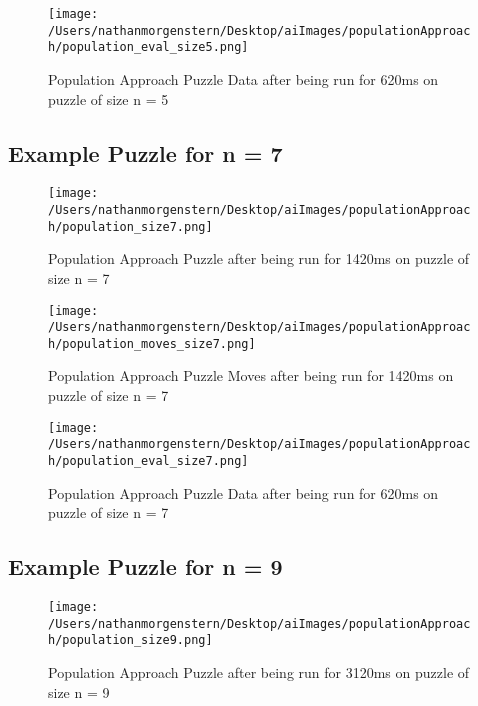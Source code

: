 \documentclass{report}
\begin{document}
	\begin{figure}[H]
	\centering
	\texttt{[image: /Users/nathanmorgenstern/Desktop/aiImages/populationApproach/population\_eval\_size5.png]}
	\caption{Population Approach Puzzle Data after being run for 620ms on puzzle of size n = 5}
	\label{fig: Population Approach Puzzle Data after being run for 620ms on puzzle of size n = 5}
	\end{figure}

\subsection{Example Puzzle for n = 7}

	\begin{figure}[H]
	\centering
	\texttt{[image: /Users/nathanmorgenstern/Desktop/aiImages/populationApproach/population\_size7.png]}
	\caption{Population Approach Puzzle after being run for 1420ms on puzzle of size n = 7}
	\label{fig: Population Approach Puzzle after being run for 1420ms on puzzle of size n = 7}
	\end{figure}
	
	\begin{figure}[H]
	\centering
	\texttt{[image: /Users/nathanmorgenstern/Desktop/aiImages/populationApproach/population\_moves\_size7.png]}
	\caption{Population Approach Puzzle Moves after being run for 1420ms on puzzle of size n = 7}
	\label{fig: Population Approach Puzzle Moves after being run for 1420ms on puzzle of size n = 7}
	\end{figure}
	
	\begin{figure}[H]
	\centering
	\texttt{[image: /Users/nathanmorgenstern/Desktop/aiImages/populationApproach/population\_eval\_size7.png]}
	\caption{Population Approach Puzzle Data after being run for 620ms on puzzle of size n = 7}
	\label{fig: Population Approach Puzzle Data after being run for 620ms on puzzle of size n = 7}
	\end{figure}


\subsection{Example Puzzle for n = 9}

	\begin{figure}[H]
	\centering
	\texttt{[image: /Users/nathanmorgenstern/Desktop/aiImages/populationApproach/population\_size9.png]}
	\caption{Population Approach Puzzle after being run for 3120ms on puzzle of size n = 9}
	\label{fig: Population Approach Puzzle after being run for 3120ms on puzzle of size n = 9}
	\end{figure}
	
\end{document}
